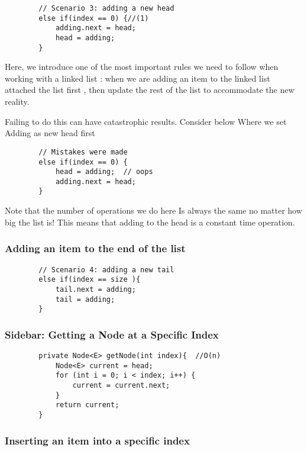 	\begin{verbatim}
		// Scenario 3: adding a new head
		else if(index == 0) {//(1)
			adding.next = head;
			head = adding;
		}
	\end{verbatim}
	
	
	
	Here, we introduce one of the most important rules we need to follow when working with a linked list : when we are adding an item to the linked list attached the list first , then update the rest of the list to accommodate the new reality.
	
	Failing to do this can have catastrophic results.  Consider below Where we set Adding as new head first 
	
	
	
	\begin{verbatim}
		// Mistakes were made
		else if(index == 0) {
			head = adding;  // oops
			adding.next = head;
		}
	\end{verbatim}
	
	
	
	
	Note that the number of operations we do here Is always the same no matter how big the list is!  This means that adding to the head is a constant time operation.
	
	\subsubsection{Adding an item to the end of the list}
	\begin{verbatim}
		// Scenario 4: adding a new tail
		else if(index == size ){
			tail.next = adding;
			tail = adding;
		}
	\end{verbatim}
	
	
	\subsubsection{Sidebar: Getting a Node at a Specific Index}
	\begin{verbatim}
		private Node<E> getNode(int index){  //O(n)
			Node<E> current = head;
			for (int i = 0; i < index; i++) {
				current = current.next;
			}
			return current;
		}	
	\end{verbatim}
	
	
	
	\subsubsection{Inserting an item into a specific index}
	
